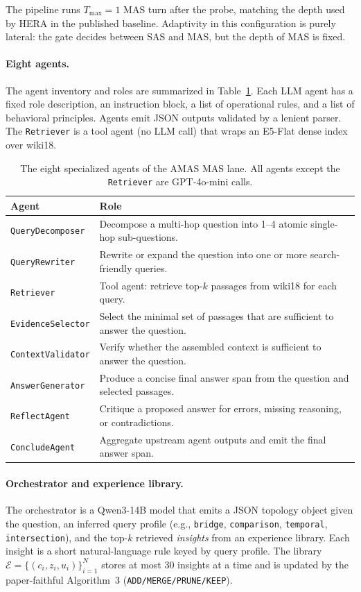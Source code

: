 \documentclass[11pt]{article}
\newcommand{\amas}{AMAS\xspace}
\newcommand{\hera}{HERA\xspace}
\newcommand{\sas}{SAS\xspace}
\newcommand{\mas}{MAS\xspace}
\newcommand{\code}[1]{\texttt{\small #1}}
\begin{document}
The pipeline runs $T_{\max}=1$ \mas turn after the probe, matching the depth
used by \hera in the published baseline. Adaptivity in this configuration is
purely lateral: the gate decides between \sas and \mas, but the depth of \mas
is fixed.

\paragraph{Eight agents.}
The agent inventory and roles are summarized in Table~\ref{tab:agents}. Each
LLM agent has a fixed role description, an instruction block, a list of
operational rules, and a list of behavioral principles. Agents emit JSON
outputs validated by a lenient parser. The \code{Retriever} is a tool agent
(no LLM call) that wraps an E5-Flat dense index over wiki18.

\begin{table}[H]
\centering
\small
\begin{tabular}{lp{8.6cm}}
\toprule
\textbf{Agent} & \textbf{Role} \\
\midrule
\code{QueryDecomposer}  & Decompose a multi-hop question into 1--4 atomic single-hop sub-questions. \\
\code{QueryRewriter}    & Rewrite or expand the question into one or more search-friendly queries. \\
\code{Retriever}        & Tool agent: retrieve top-$k$ passages from wiki18 for each query. \\
\code{EvidenceSelector} & Select the minimal set of passages that are sufficient to answer the question. \\
\code{ContextValidator} & Verify whether the assembled context is sufficient to answer the question. \\
\code{AnswerGenerator}  & Produce a concise final answer span from the question and selected passages. \\
\code{ReflectAgent}     & Critique a proposed answer for errors, missing reasoning, or contradictions. \\
\code{ConcludeAgent}    & Aggregate upstream agent outputs and emit the final answer span. \\
\bottomrule
\end{tabular}
\caption{The eight specialized agents of the \amas \mas lane. All agents
except the \code{Retriever} are GPT-4o-mini calls.}
\label{tab:agents}
\end{table}

\paragraph{Orchestrator and experience library.}
The orchestrator is a Qwen3-14B model that emits a JSON topology object given
the question, an inferred query profile (e.g., \texttt{bridge},
\texttt{comparison}, \texttt{temporal}, \texttt{intersection}), and the
top-$k$ retrieved \emph{insights} from an experience library. Each insight is
a short natural-language rule keyed by query profile. The library
$\mathcal{E} = \{(c_i, z_i, u_i)\}_{i=1}^{N}$ stores at most 30 insights at a
time and is updated by the paper-faithful Algorithm~3
(\code{ADD/MERGE/PRUNE/KEEP}).
\end{document}
